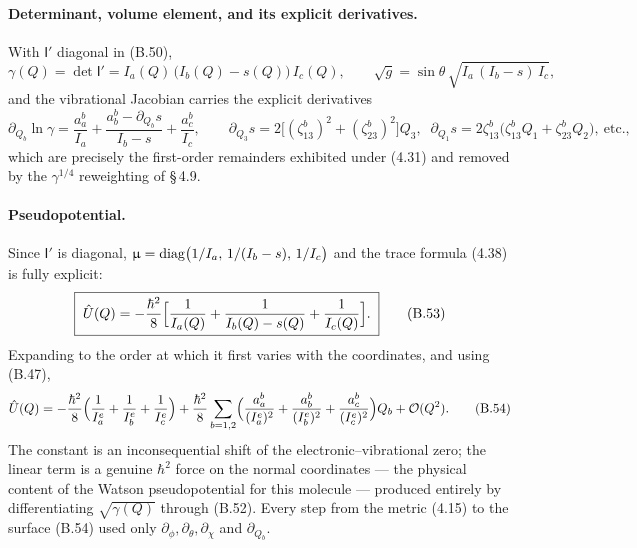 \paragraph{Determinant, volume element, and its explicit derivatives.}
With $\mathsf I'$ diagonal in (B.50),
\begin{equation}
\gamma(Q)=\det\mathsf I'=I_a(Q)\,\bigl(I_b(Q)-s(Q)\bigr)\,I_c(Q),\qquad
\sqrt{g}=\sin\theta\,\sqrt{I_a\,(I_b-s)\,I_c}, \tag{B.51}
\end{equation}
and the vibrational Jacobian carries the explicit derivatives
\begin{equation}
\partial_{Q_b}\ln\gamma
=\frac{a_a^{b}}{I_a}+\frac{a_b^{b}-\partial_{Q_b}s}{I_b-s}+\frac{a_c^{b}}{I_c},
\qquad
\partial_{Q_3}s=2\bigl[(\zeta^{b}_{13})^2+(\zeta^{b}_{23})^2\bigr]Q_3,\;\;
\partial_{Q_1}s=2\zeta^{b}_{13}\bigl(\zeta^{b}_{13}Q_1+\zeta^{b}_{23}Q_2\bigr),\ \text{etc.}, \tag{B.52}
\end{equation}
which are precisely the first-order remainders exhibited under (4.31) and removed by the $\gamma^{1/4}$ reweighting of \S\,4.9.

\paragraph{Pseudopotential.}
Since $\mathsf I'$ is diagonal, $\upmu=\operatorname{diag}\bigl(1/I_a,\,1/(I_b-s),\,1/I_c\bigr)$ and the trace formula (4.38) is fully explicit:
\begin{equation}
\boxed{\;\hat U(Q)=-\frac{\hbar^2}{8}\Bigl[\frac{1}{I_a(Q)}+\frac{1}{I_b(Q)-s(Q)}+\frac{1}{I_c(Q)}\Bigr].\;}\tag{B.53}
\end{equation}
Expanding to the order at which it first varies with the coordinates, and using (B.47),
\begin{equation}
\hat U(Q)=-\frac{\hbar^2}{8}\Bigl(\frac{1}{I_a^{e}}+\frac{1}{I_b^{e}}+\frac{1}{I_c^{e}}\Bigr)
+\frac{\hbar^2}{8}\sum_{b=1,2}\Bigl(\frac{a_a^{b}}{(I_a^{e})^2}+\frac{a_b^{b}}{(I_b^{e})^2}+\frac{a_c^{b}}{(I_c^{e})^2}\Bigr)Q_b+\mathcal O(Q^2). \tag{B.54}
\end{equation}
The constant is an inconsequential shift of the electronic--vibrational zero; the linear term is a genuine $\hbar^2$ force on the normal coordinates --- the physical content of the Watson pseudopotential for this molecule --- produced entirely by differentiating $\sqrt{\gamma(Q)}$ through (B.52). Every step from the metric (4.15) to the surface (B.54) used only $\partial_\phi,\partial_\theta,\partial_\chi$ and $\partial_{Q_b}$.

